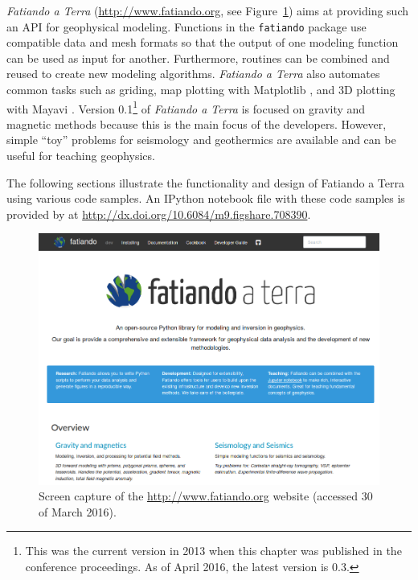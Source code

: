 \textit{Fatiando a Terra} (\url{http://www.fatiando.org}, see
Figure~\ref{fig:p1-fatiando-site}) aims at providing such an API
for geophysical modeling. Functions in the \texttt{fatiando} package use
compatible data and mesh formats so that the output of one modeling function
can be used as input for another. Furthermore, routines can be combined and
reused to create new modeling algorithms.  \textit{Fatiando a Terra} also automates
common tasks such as griding, map plotting with Matplotlib \citep[][
\url{http://matplotlib.org}]{hunter2007}, and 3D plotting with Mayavi \citep[][
\url{http://code.enthought.com/projects/mayavi}]{ramachandran2011}.  Version
0.1\footnote{
    This was the current version in 2013 when this chapter was published in the
    conference proceedings. As of April 2016, the latest version is 0.3.}
of \textit{Fatiando a Terra} is focused on gravity and magnetic methods because this is
the main focus of the developers.  However, simple ``toy'' problems for
seismology and geothermics are available and can be useful for teaching
geophysics.

The following sections illustrate the functionality and design of Fatiando a
Terra using various code samples. An IPython \citep[][
\url{http://ipython.org/}]{perez2007} notebook file with these code samples is
provided by \citet{uieda2013} at
\url{http://dx.doi.org/10.6084/m9.figshare.708390}.

\begin{figure}
    \centering
    \includegraphics[width=\textwidth]{figures/paper-fatiando/screen-capture-fatiando-org-30-03-2016.png}
    \caption{
        Screen capture of the \url{http://www.fatiando.org} website (accessed
        30 of March 2016).
    }
    \label{fig:p1-fatiando-site}
\end{figure}



